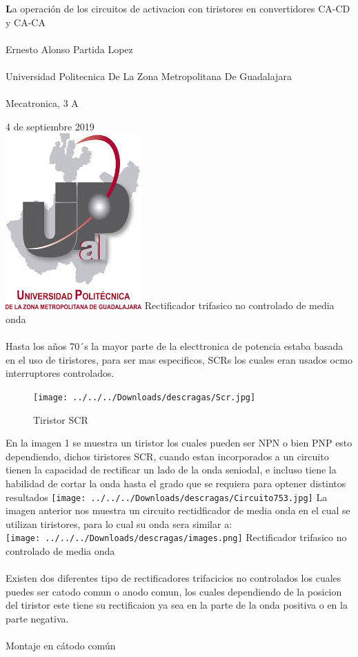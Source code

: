 \documentclass[11pt]{report}
\begin{document}
{\huge{\textbf La operación de los circuitos de activacion con tiristores en convertidores CA-CD y CA-CA}\\\\}
{\Large Ernesto Alonso Partida Lopez}\\\\
{\Large Universidad Politecnica De La Zona Metropolitana De Guadalajara}\\\\
{\Large Mecatronica, 3 A}\\
\date 24 de septiembre 2019\\
\includegraphics[scale=1]{upzmg.jpg} 
\newpage
{\Huge Rectificador trifasico no controlado de media onda}\\\\

{\Large Hasta los años 70´s la mayor parte de la electtronica de potencia estaba basada en el uso de tiristores, para ser mas especificos, SCRs los cuales eran usados ocmo interruptores controlados.}
\begin{figure}[hbtp]
\caption{Tiristor SCR}
\texttt{[image: ../../../Downloads/descragas/Scr.jpg]}
\end{figure}
 {\Large En la imagen 1 se muestra un tiristor los cuales pueden ser NPN o bien PNP esto dependiendo, dichos tiristores SCR, cuando estan incorporados a un circuito tienen la capacidad de rectificar un lado de la onda seniodal, e incluso tiene la habilidad de cortar la onda hasta el grado que se requiera para optener distintos resultados}
 \texttt{[image: ../../../Downloads/descragas/Circuito753.jpg]} 
 {\Large La imagen anterior nos muestra un circuito rectidficador de media onda en el cual se utilizan tiristores, para lo cual su onda sera similar a:}\\
 \texttt{[image: ../../../Downloads/descragas/images.png]} 
 \newpage
 {\huge Rectificador trifasico no controlado de media onda}\\\\
 {\Large Existen dos diferentes tipo de rectificadores trifacicios no controlados los cuales puedes ser catodo comun o anodo comun, los cuales dependiendo de la posicion del tiristor este tiene su rectificaion ya sea en la parte de la onda positiva o en la parte negativa.}\\\\
{\huge Montaje en cátodo común}\\ 
\end{document}
